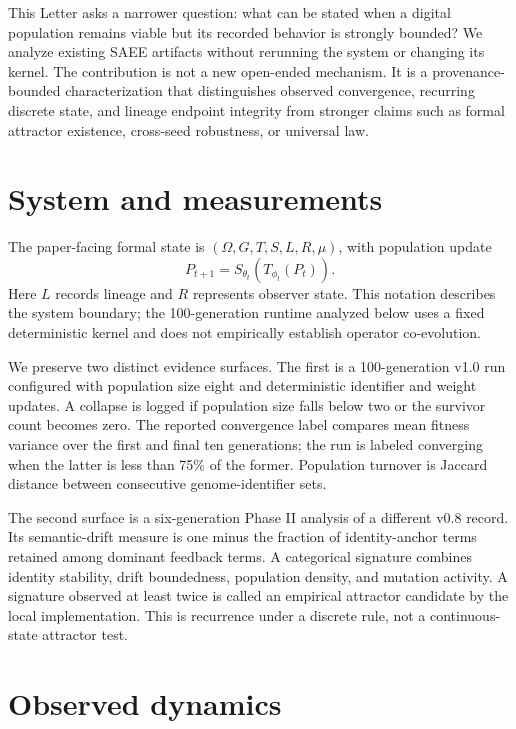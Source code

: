 \documentclass[12pt]{article}
\begin{document}
This Letter asks a narrower question: what can be stated when a digital
population remains viable but its recorded behavior is strongly bounded? We
analyze existing SAEE artifacts without rerunning the system or changing its
kernel. The contribution is not a new open-ended mechanism. It is a
provenance-bounded characterization that distinguishes observed convergence,
recurring discrete state, and lineage endpoint integrity from stronger claims
such as formal attractor existence, cross-seed robustness, or universal law.

\section{System and measurements}

The paper-facing formal state is
\(
  (\Omega,G,T,S,L,R,\mu)
\), with population update
\begin{equation}
  P_{t+1}=S_{\theta_t}\!\left(T_{\phi_t}(P_t)\right).
\end{equation}
Here \(L\) records lineage and \(R\) represents observer state. This notation
describes the system boundary; the 100-generation runtime analyzed below uses
a fixed deterministic kernel and does not empirically establish operator
co-evolution.

We preserve two distinct evidence surfaces. The first is a 100-generation
v1.0 run configured with population size eight and deterministic identifier and
weight updates. A collapse is logged if population size falls below two or the
survivor count becomes zero. The reported convergence label compares mean
fitness variance over the first and final ten generations; the run is labeled
converging when the latter is less than 75\% of the former. Population turnover
is Jaccard distance between consecutive genome-identifier sets.

The second surface is a six-generation Phase II analysis of a different v0.8
record. Its semantic-drift measure is one minus the fraction of identity-anchor
terms retained among dominant feedback terms. A categorical signature combines
identity stability, drift boundedness, population density, and mutation
activity. A signature observed at least twice is called an empirical attractor
candidate by the local implementation. This is recurrence under a discrete
rule, not a continuous-state attractor test.

\section{Observed dynamics}
\end{document}

